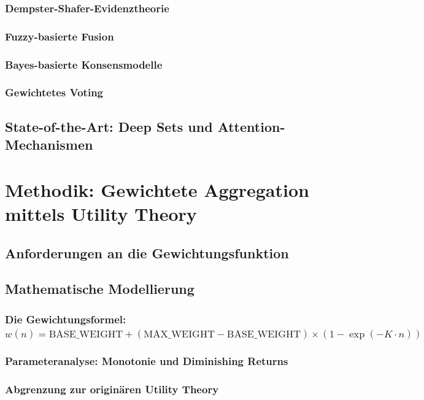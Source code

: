         \subsubsection{Dempster-Shafer-Evidenztheorie}
        \subsubsection{Fuzzy-basierte Fusion}
        \subsubsection{Bayes-basierte Konsensmodelle}
        \subsubsection{Gewichtetes Voting}
    \subsection{State-of-the-Art: Deep Sets und Attention-Mechanismen}

\newpage

\section{Methodik: Gewichtete Aggregation mittels Utility Theory}
    \subsection{Anforderungen an die Gewichtungsfunktion}
    \subsection{Mathematische Modellierung}
        \subsubsection{Die Gewichtungsformel: $w(n) = \text{BASE\_WEIGHT} + (\text{MAX\_WEIGHT} - \text{BASE\_WEIGHT}) \times (1 - \exp(-K \cdot n))$}
        \subsubsection{Parameteranalyse: Monotonie und Diminishing Returns}
        \subsubsection{Abgrenzung zur originären Utility Theory}
